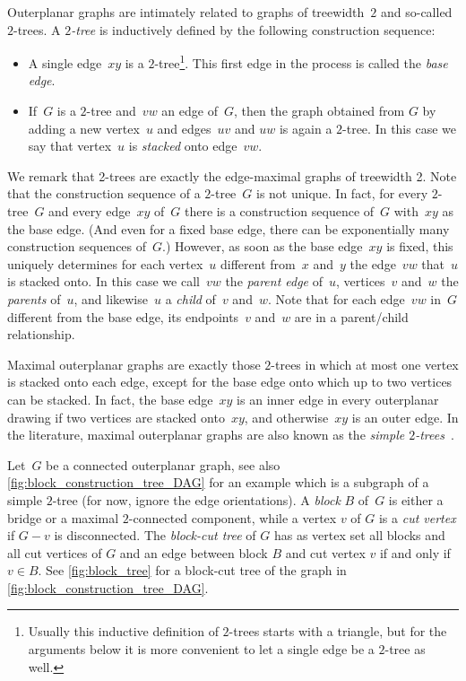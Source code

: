 \documentclass{article}
\begin{document}
Outerplanar graphs are intimately related to graphs of treewidth~$2$ and so-called $2$-trees.
A \emph{$2$-tree} is inductively defined by the following construction sequence:
\begin{itemize}
    \item A single edge~$xy$ is a $2$-tree\footnote{
        Usually this inductive definition of $2$-trees starts with a triangle, but for the arguments below it is more convenient to let a single edge be a $2$-tree as well.
    }.
    This first edge in the process is called the \emph{base edge}.

    \item If~$G$ is a $2$-tree and~$vw$ an edge of~$G$, then the graph obtained from $G$ by adding a new vertex~$u$ and edges~$uv$ and $uw$ is again a $2$-tree.
    In this case we say that vertex~$u$ is \emph{stacked} onto edge~$vw$.
\end{itemize}
We remark that 2-trees are exactly the edge-maximal graphs of treewidth 2.
Note that the construction sequence of a $2$-tree~$G$ is not unique.
In fact, for every $2$-tree~$G$ and every edge~$xy$ of~$G$ there is a construction sequence of~$G$ with~$xy$ as the base edge.
(And even for a fixed base edge, there can be exponentially many construction sequences of~$G$.)
However, as soon as the base edge~$xy$ is fixed, this uniquely determines for each vertex~$u$ different from~$x$ and~$y$ the edge~$vw$ that~$u$ is stacked onto.
In this case we call~$vw$ the \emph{parent edge} of~$u$, vertices~$v$ and~$w$ the \emph{parents} of~$u$, and likewise~$u$ a \emph{child} of~$v$ and~$w$.
Note that for each edge~$vw$ in~$G$ different from the base edge, its endpoints~$v$ and~$w$ are in a parent/child relationship. %

Maximal outerplanar graphs are exactly those $2$-trees in which at most one vertex is stacked onto each edge, except for the base edge onto which up to two vertices can be stacked.
In fact, the base edge~$xy$ is an inner edge in every outerplanar drawing if two vertices are stacked onto~$xy$, and otherwise~$xy$ is an outer edge.
In the literature, maximal outerplanar graphs are also known as the \emph{simple $2$-trees}~\cite{Knauer2012_SimpleTreewidth,Wulf2016_SimpleTreewidth}.

Let~$G$ be a connected outerplanar graph, see also \cref{fig:block_construction_tree_DAG} for an example which is a subgraph of a simple $2$-tree (for now, ignore the edge orientations).
A \emph{block} $B$ of~$G$ is either a bridge or a maximal $2$-connected component, while a vertex $v$ of $G$ is a \emph{cut vertex} if $G-v$ is disconnected.
The \emph{block-cut tree} of $G$ has as vertex set all blocks and all cut vertices of $G$ and an edge between block $B$ and cut vertex $v$ if and only if $v \in B$.
See \cref{fig:block_tree} for a block-cut tree of the graph in \cref{fig:block_construction_tree_DAG}.
\end{document}
